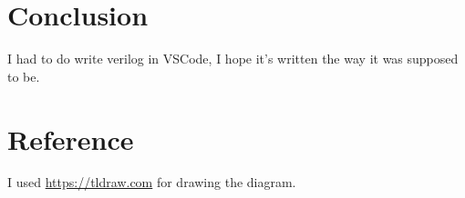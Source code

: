 \documentclass{article}
\begin{document}
    \section*{Conclusion}

    I had to do write verilog in VSCode, I hope it's written the way it was supposed to be.

    \section*{Reference}

    I used \url{https://tldraw.com} for drawing the diagram.
\end{document}
